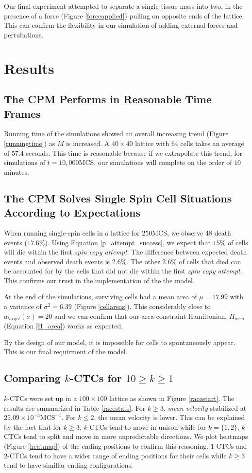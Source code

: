 \documentclass[12pt]{article}
\begin{document}
Our final experiment attempted to separate a single tissue mass into two, in the presence of a force (Figure \ref{forceapplied}) pulling on opposite ends of the lattice. This can confirm the flexibility in our simulation of adding external forces and pertubations.

\section{Results}
\subsection{The CPM Performs in Reasonable Time Frames}
Running time of the simulations showed an overall increasing trend (Figure \ref{runningtime}) as $M$ is increased. A $40\times40$ lattice with $64$ cells takes an average of $57.4$ seconds. This time is reasonable because if we extrapolate this trend, for simulations of $t=10,000$MCS, our simulations will complete on the order of $10$ minutes.

\subsection{The CPM Solves Single Spin Cell Situations According to Expectations}
When running single-spin cells in a lattice for $250$MCS, we observe 48 death events ($17.6\%$). Using Equation \ref{p_attempt_success}, we expect that $15\%$ of cells will die within the first \emph{spin copy attempt}. The difference between expected death events and observed death events is $2.6\%$. The other $2.6\%$ of cells that died can be accounted for by the cells that did not die within the first \emph{spin copy attempt}. This confirms our trust in the implementation of the the model.

At the end of the simulations, surviving cells had a mean area of $\mu = 17.99$ with a variance of $\sigma^2 = 6.39$ (Figure \ref{cellareas}). This considerably close to $a_{target}(\sigma)=20$ and we can confirm that our area constraint Hamiltonian, $H_{area}$ (Equation \ref{H_area}) works as expected. 

By the design of our model, it is impossible for cells to spontaneously appear. This is our final requirment of the model.

\subsection{Comparing $k$-CTCs for $10 \geq k\geq1$} %
$k$-CTCs were set up in a $100\times100$ lattice as shown in Figure \ref{racestart}. The results are summarized in Table \ref{racestats}. For $k\geq3$, \emph{mean velocity} stabilized at $25.09\times10^{-3}\text{MCS}^{-1}$. For $k\leq2$, the mean velocity is lower. This can be explained by the fact that for $k\geq3$, $k$-CTCs tend to move in unison while for $k=\{1,2\}$, $k$-CTCs tend to split and move in more unpredictable directions. We plot heatmaps (Figure \ref{heatmap}) of the ending positions to confirm this reasoning. $1$-CTCs and $2$-CTCs tend to have a wider range of ending positions for their cells while $k\geq3$ tend to have simillar ending configurations.
\end{document}

